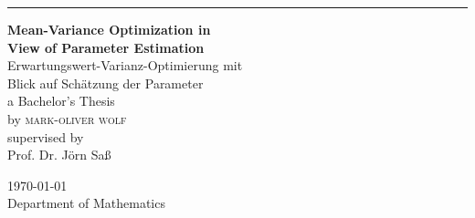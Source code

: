 \begin{titlepage} %
	
	\raggedleft %
	
	\rule{1pt}{0.98\textheight} %
	\hspace{0.05\textwidth} %
	\parbox[b]{0.9\textwidth}{ %
		
		{\Huge\bfseries Mean-Variance Optimization in\\[0.1\baselineskip] View of Parameter Estimation} \\[0\baselineskip] %
		
		{\Large Erwartungswert-Varianz-Optimierung mit\\[0.2\baselineskip] Blick auf Schätzung der Parameter}\\[2.2\baselineskip] %
		
		{\Large a Bachelor's Thesis}\\[2.4\baselineskip] %
		{by \Large\textsc{mark-oliver wolf}}\\[2.4\baselineskip] %
		{\large supervised by\\ Prof. Dr. Jörn Saß}
		
		\vspace{0.3\textheight} %
		
		{\Large \today} \\[0.3\baselineskip]
		
		{\Large Department of Mathematics} \\[0.3\baselineskip]
	}
	
\end{titlepage}

